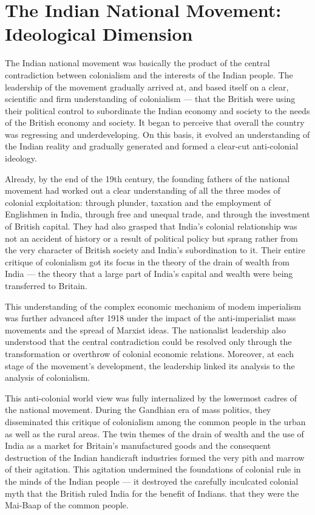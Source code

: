 \chapter[Ideological Dimension of Indian National Movement]{The Indian National Movement: Ideological Dimension}
\begin{multicols}{2}\label{chapter:CH39}

The Indian national movement was basically the product of the central contradiction between colonialism and the interests of the Indian people. The leadership of the movement gradually arrived at, and based itself on a clear, scientific and firm understanding of colonialism --- that the British were using their political control to subordinate the Indian economy and society to the needs of the British economy and society. It began to perceive that overall the country was regressing and underdeveloping. On this basis, it evolved an understanding of the Indian reality and gradually generated and formed a clear-cut anti-colonial ideology.

Already, by the end of the 19th century, the founding fathers of the national movement had worked out a clear understanding of all the three modes of colonial exploitation: through plunder, taxation and the employment of Englishmen in India, through free and unequal trade, and through the investment of British capital. They had also grasped that India's colonial relationship was not an accident of history or a result of political policy but sprang rather from the very character of British society and India's subordination to it. Their entire critique of colonialism got its focus in the theory of the drain of wealth from India --- the theory that a large part of India's capital and wealth were being transferred to Britain.

This understanding of the complex economic mechanism of modem imperialism was further advanced after 1918 under the impact of the anti-imperialist mass movements and the spread of Marxist ideas. The nationalist leadership also understood that the central contradiction could be resolved only through the transformation or overthrow of colonial economic relations. Moreover, at each stage of the movement's development, the leadership linked its analysis to the analysis of colonialism.

This anti-colonial world view was fully internalized by the lowermost cadres of the national movement. During the Gandhian era of mass politics, they disseminated this critique of colonialism among the common people in the urban as well as the rural areas. The twin themes of the drain of wealth and the use of India as a market for Britain's manufactured goods and the consequent destruction of the Indian handicraft industries formed the very pith and marrow of their agitation. This agitation undermined the foundations of colonial rule in the minds of the Indian people --- it destroyed the carefully inculcated colonial myth that the British ruled India for the benefit of Indians. that they were the Mai-Baap of the common people.


\end{multicols}
